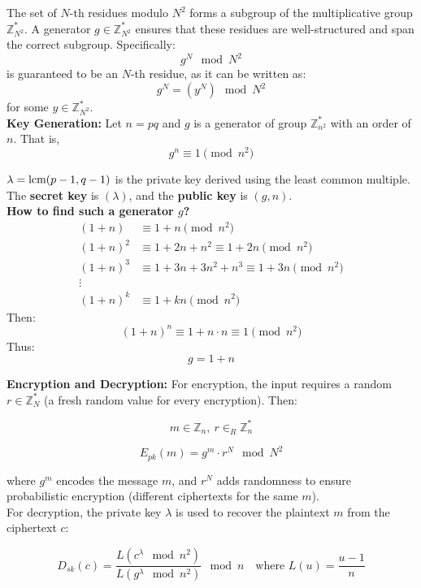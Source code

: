 The set of \( N \)-th residues modulo \( N^2 \) forms a subgroup of the multiplicative group \( \mathbb{Z}_{N^2}^* \). A generator \( g \in \mathbb{Z}_{N^2}^* \) ensures that these residues are well-structured and span the correct subgroup. Specifically:
\[
g^N \mod N^2
\]
is guaranteed to be an \( N \)-th residue, as it can be written as:
\[
g^N = (y^N) \mod N^2
\]
for some \( y \in \mathbb{Z}_{N^2}^* \). \\


\textbf{Key Generation:}
Let $n= pq$ and $g$ is a generator of group $\mathbb{Z}_{n^2}^*$ with an order of $n$. That is,
\[ g^n \equiv 1 \pmod{n^2} \]

$\lambda = \text{lcm}(p-1, q-1)$ is the private key derived using the least common multiple.
The \textbf{secret key} is $(\lambda)$, and the \textbf{public key} is $(g,n)$. \\

\textbf{How to find such a generator $g$?} \\
\begin{align*}
    (1 + n) &\equiv 1 + n \pmod{n^2} \\
    (1 + n)^2 &\equiv 1 + 2n + n^2 \equiv 1 + 2n \pmod{n^2} \\
    (1 + n)^3 &\equiv 1 + 3n + 3n^2 + n^3 \equiv 1 + 3n \pmod{n^2} \\
    \vdots & \\
    (1 + n)^k &\equiv 1 + kn \pmod{n^2}
    \end{align*}
    Then:
    \[
    (1 + n)^n \equiv 1 + n \cdot n \equiv 1 \pmod{n^2}
    \]
    Thus:
    \[
    g = 1 + n
    \]

\textbf{Encryption and Decryption:}
For encryption, the input requires a random \( r \in \mathbb{Z}_N^* \) (a fresh random value for every encryption).
Then: 

\[ m \in \mathbb{Z}_n, \ r \in_R \mathbb{Z}_n^* \]

\[ E_{pk}(m) = g^m \cdot r^N \mod N^2 \] 


where \( g^m \) encodes the message \( m \), and \( r^N \) adds randomness to ensure probabilistic encryption (different ciphertexts for the same \( m \)). \\

For decryption, the private key \( \lambda \) is used to recover the plaintext \( m \) from the ciphertext \( c \):

\[
D_{sk}(c) = \frac{L(c^\lambda \mod n^2)}{L(g^\lambda \mod n^2)} \mod n \quad \text{where } L(u) = \frac{u - 1}{n}
\]

